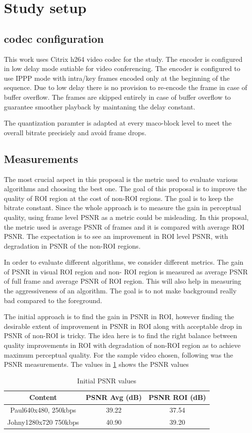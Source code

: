 \documentclass[11pt]{article} %
\begin{document}
\section{Study setup}
\subsection{codec configuration}      
This work uses Citrix h264 video codec for the study. The encoder is configured in low delay mode sutiable for video conferencing. The encoder is configured to use IPPP mode with intra/key frames encoded only at the beginning of the sequence. Due to low delay there is no provision to re-encode the frame in case of buffer overflow. The frames are skipped entirely in case of buffer overflow to guarantee smoother playback by maintaning the delay constant. 

The quantization paramter is adapted at every maco-block level to meet the overall bitrate precisiely and avoid frame drops. 
\subsection{Measurements}

The most crucial aspect in this proposal is the metric used to evaluate various algorithms and choosing the best one. The goal of this proposal is to improve the quality of ROI region at the cost of non-ROI regions. The goal is to keep the bitrate constant. Since the whole approach is to measure the gain in perceptual quality, using frame level PSNR as a metric could be misleading.
In this proposal, the metric used is average PSNR of frames and it is compared with average ROI PSNR. The expectation is to see an improvement in ROI level PSNR, with degradation in PSNR of the non-ROI regions. 

In order to evaluate different algorithms, we consider different metrics. The gain of PSNR in visual ROI region and non- ROI region is measured as average PSNR of full frame and average PSNR of ROI region. This will also help in measuring the aggressiveness of an algorithm. The goal is to not make background really bad compared to the foreground.

The initial approach is to find the gain in PSNR in ROI, however finding the desirable extent of improvement in PSNR in ROI along with acceptable drop in PSNR of non-ROI is tricky. The idea here is to find the right balance between quality improvements in ROI with degradation of non-ROI region as to achieve maximum perceptual quality. For the sample video chosen, following was the PSNR measurements. The values in \ref{InitPSNR1} shows the PSNR values 
\begin{table} [h!]
\centering
\begin{tabular}{ |c|c|c| }
 \hline
Content & PSNR Avg (dB) & PSNR ROI (dB) \\
 \hline 
 Paul640x480, 250kbps & 39.22 & 37.54 \\ 
 Johny1280x720 750kbps & 40.90 & 39.20 \\  
 \hline
\end{tabular}
 \caption{Initial PSNR values}
 \label{InitPSNR1}

\end{table}
\end{document}

